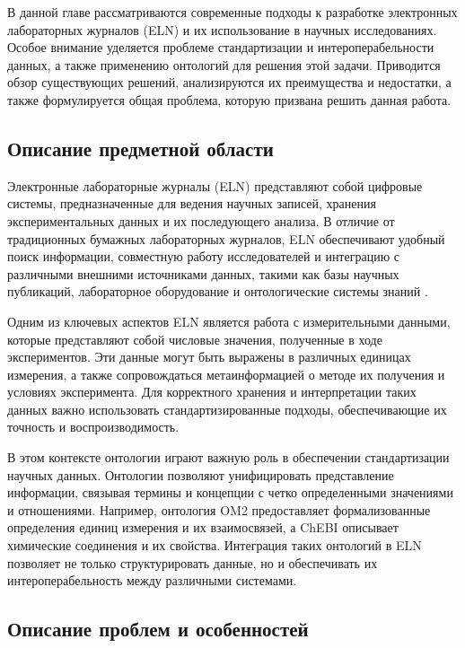 \setcounter{section}{1}

В данной главе рассматриваются современные подходы к разработке электронных лабораторных журналов (ELN) и их использование в научных исследованиях. Особое внимание уделяется проблеме стандартизации и интероперабельности данных, а также применению онтологий для решения этой задачи. Приводится обзор существующих решений, анализируются их преимущества и недостатки, а также формулируется общая проблема, которую призвана решить данная работа.

\subsection{Описание предметной области}

Электронные лабораторные журналы (ELN) представляют собой цифровые системы, предназначенные для ведения научных записей, хранения экспериментальных данных и их последующего анализа. В отличие от традиционных бумажных лабораторных журналов, ELN обеспечивают удобный поиск информации, совместную работу исследователей и интеграцию с различными внешними источниками данных, такими как базы научных публикаций, лабораторное оборудование и онтологические системы знаний \cite{ontology:base2}.

Одним из ключевых аспектов ELN является работа с измерительными данными, которые представляют собой числовые значения, полученные в ходе экспериментов. Эти данные могут быть выражены в различных единицах измерения, а также сопровождаться метаинформацией о методе их получения и условиях эксперимента. Для корректного хранения и интерпретации таких данных важно использовать стандартизированные подходы, обеспечивающие их точность и воспроизводимость.

В этом контексте онтологии играют важную роль в обеспечении стандартизации научных данных. Онтологии позволяют унифицировать представление информации, связывая термины и концепции с четко определенными значениями и отношениями. Например, онтология OM2 предоставляет формализованные определения единиц измерения и их взаимосвязей, а ChEBI описывает химические соединения и их свойства. Интеграция таких онтологий в ELN позволяет не только структурировать данные, но и обеспечивать их интероперабельность между различными системами.

\subsection{Описание проблем и особенностей}

